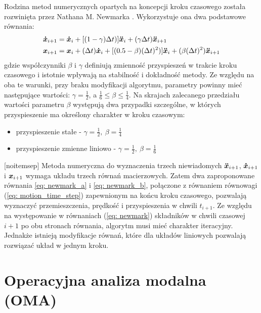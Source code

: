 Rodzina metod numerycznych opartych na koncepcji kroku czasowego została rozwinięta przez Nathana M. Newmarka \parencite{Newmark1959}. Wykorzystuje ona dwa podstawowe równania:
\begin{subequations} \label{eq: newmark}
	\begin{align}
		\bm{\dot{x}}_{i+1} &= \bm{\dot{x}}_{i} + [(1-\gamma)\Delta t)]\bm{\ddot{x}}_{i} + (\gamma\Delta t)\bm{\ddot{x}}_{i+1} 
		\label{eq: newmark_a}\\
		\bm{x}_{i+1} &= \bm{x}_{i} + (\Delta t)\bm{\dot{x}}_{i} + [(0.5-\beta)(\Delta t)^2)]\bm{\ddot{x}}_{i}+ (\beta(\Delta t)^2)\bm{\ddot{x}}_{i+1} 
		\label{eq: newmark_b}
	\end{align}
\end{subequations}
gdzie współczynniki $\beta$ i $\gamma$ definiują zmienność przyspieszeń w trakcie kroku czasowego i istotnie wpływają na stabilność i dokładność metody. Ze względu na oba te warunki, przy braku modyfikacji algorytmu, parametry powinny mieć następujące wartości: $\gamma = \frac{1}{2}$, a $ \frac{1}{6}\leq \beta \leq \frac{1}{4}$. Na skrajach zalecanego przedziału wartości parametru $\beta$ występują dwa przypadki szczególne, w których przyspieszenie ma określony charakter w kroku czasowym:
\begin{itemize}[noitemsep]
	\item przyspieszenie stałe - $\gamma = \frac{1}{2},\: \beta = \frac{1}{4}$
	\item przyspieszenie zmienne liniowo - $\gamma = \frac{1}{2},\: \beta = \frac{1}{6}$
\end{itemize}[noitemsep]
Metoda numeryczna do wyznaczenia trzech niewiadomych $\bm{\ddot{x}}_{i+1}$, $\bm{\dot{x}}_{i+1}$ i $\bm{x}_{i+1}$ wymaga układu trzech równań macierzowych. Zatem dwa zaproponowane równania \ref{eq: newmark_a} i \ref{eq: newmark_b}, połączone z równaniem równowagi (\ref{eq: motion_time_step}) zapewnionym na końcu kroku czasowego, pozwalają wyznaczyć przemieszczenia, prędkość i przyspieszenia w chwili $t_{i+1}$. Ze względu na występowanie w równaniach (\ref{eq: newmark}) składników w chwili czasowej $i+1$ po obu stronach równania, algorytm musi mieć charakter iteracyjny. Jednakże istnieją modyfikacje równań, które dla układów liniowych pozwalają rozwiązać układ w jednym kroku.


\section{Operacyjna analiza modalna (OMA)}
